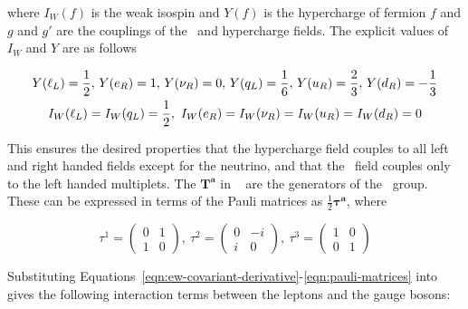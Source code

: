 where $I_{W}(f)$ is the weak isospin and $Y(f)$ is the
hypercharge of fermion $f$ and $g$ and $g'$ are the couplings of the \sutwo\ and
hypercharge fields. The explicit values of $I_{W}$ and $Y$ are as
follows

\begin{gather}
Y(\ell_{L}) = \frac{1}{2},\, Y(e_{R}) = 1,\, Y(\nu_{R}) =0,\, Y(q_{L}) = \frac{1}{6},\, Y(u_{R}) = \frac{2}{3},\, Y(d_{R}) = - \frac{1}{3} \\
I_{W}(\ell_{L}) = I_{W}(q_{L}) = \frac{1}{2}, \  I_{W}(e_{R}) = I_{W}(\nu_{R}) =  I_{W}(u_{R}) = I_{W}(d_{R}) = 0 
\label{eqn:hypercharges}
\end{gather}

This ensures the desired properties that the hypercharge field couples to all
left and right handed fields except for the neutrino, and that the \sutwo\ field
couples only to the left handed multiplets. The $\mathbf{T^{a}}$ in
~ are the generators of the \sutwo\ group. These
can be expressed in terms of the Pauli matrices as $\frac{1}{2}
\mathbf{\tau^{a}}$, where

\begin{equation}
\tau^{1} = \left( \begin{array}{cc} 0 & 1 \\ 1 & 0 \end{array} \right), \  
\tau^{2} = \left( \begin{array}{cc} 0 & -i \\ i & 0 \end{array} \right), \  
\tau^{3} = \left( \begin{array}{cc} 1 & 0 \\ 0 & 1 \end{array} \right)
\label{eqn:pauli-matrices}
\end{equation}

Substituting Equations~\ref{eqn:ew-covariant-derivative}-\ref{eqn:pauli-matrices}
 into~\eqn{ew-lagrangian} gives the following
interaction terms between the leptons and the gauge bosons:

